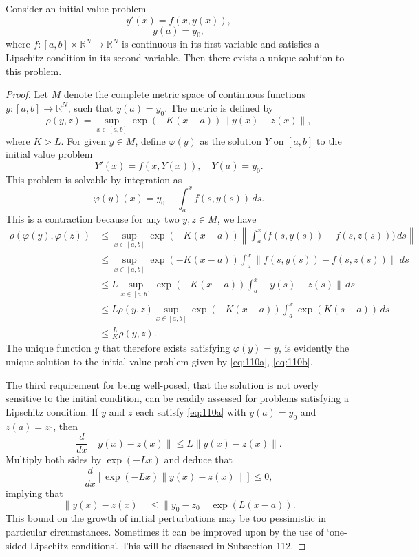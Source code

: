 \begin{theorem}

  \label{thm:110C}
Consider an initial value problem
\[
y'(x) = f(x, y(x)), \tag{110a}
\]
\[
y(a) = y_0, \tag{110b}
\]
where \( f : [a, b] \times \mathbb{R}^N \to \mathbb{R}^N \) is continuous in its first variable and satisfies a Lipschitz condition in its second variable. Then there exists a unique solution to this problem.
\end{theorem}

\begin{proof}
Let \( M \) denote the complete metric space of continuous functions \( y : [a, b] \to \mathbb{R}^N \), such that \( y(a) = y_0 \). The metric is defined by
\[
\rho(y, z) = \sup_{x \in [a, b]} \exp(-K(x - a)) \| y(x) - z(x) \|,
\]
where \( K > L \). For given \( y \in M \), define \( \varphi(y) \) as the solution \( Y \) on \( [a, b] \) to the initial value problem
\[
Y'(x) = f(x, Y(x)), \quad Y(a) = y_0.
\]
This problem is solvable by integration as
\[
\varphi(y)(x) = y_0 + \int_a^x f(s, y(s)) \, ds.
\]
This is a contraction because for any two \( y, z \in M \), we have
\begin{align*}
\rho(\varphi(y), \varphi(z)) &\leq \sup_{x \in [a, b]} \exp(-K(x - a)) \left\| \int_a^x \bigl( f(s, y(s)) - f(s, z(s)) \bigr) \, ds \right\| \\
&\leq \sup_{x \in [a, b]} \exp(-K(x - a)) \int_a^x \| f(s, y(s)) - f(s, z(s)) \| \, ds \\
&\leq L \sup_{x \in [a, b]} \exp(-K(x - a)) \int_a^x \| y(s) - z(s) \| \, ds \\
&\leq L \rho(y, z) \sup_{x \in [a, b]} \exp(-K(x - a)) \int_a^x \exp(K(s - a)) \, ds \\
&\leq \frac{L}{K} \rho(y, z).
\end{align*}
The unique function \( y \) that therefore exists satisfying \( \varphi(y) = y \), is evidently the unique solution to the initial value problem given by \eqref{eq:110a}, \eqref{eq:110b}.

The third requirement for being well-posed, that the solution is not overly sensitive to the initial condition, can be readily assessed for problems satisfying a Lipschitz condition. If \( y \) and \( z \) each satisfy \eqref{eq:110a} with \( y(a) = y_0 \) and \( z(a) = z_0 \), then
\[
\frac{d}{dx} \| y(x) - z(x) \| \leq L \| y(x) - z(x) \|.
\]
Multiply both sides by \( \exp(-Lx) \) and deduce that
\[
\frac{d}{dx} \left[ \exp(-Lx) \| y(x) - z(x) \| \right] \leq 0,
\]
implying that
\[
\| y(x) - z(x) \| \leq \| y_0 - z_0 \| \exp( L(x - a) ). \tag{110c}
\]
This bound on the growth of initial perturbations may be too pessimistic in particular circumstances. Sometimes it can be improved upon by the use of `one-sided Lipschitz conditions'. This will be discussed in Subsection 112.
\end{proof}


